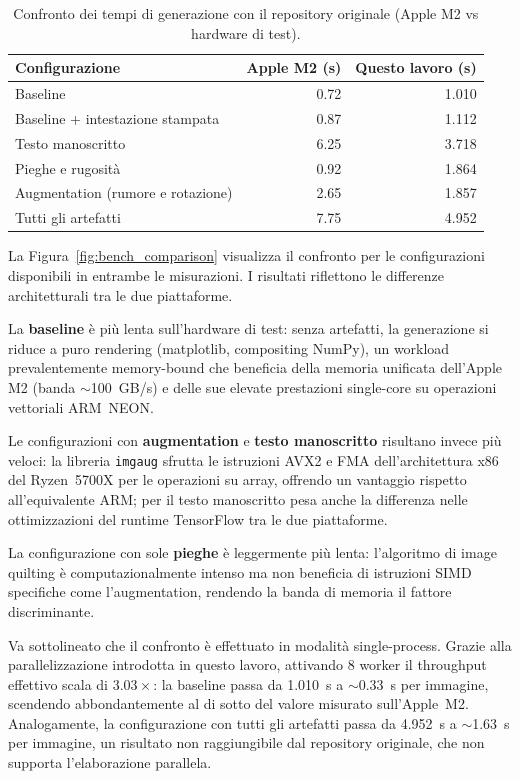 \begin{table}[H]
\centering
\caption{Confronto dei tempi di generazione con il repository originale (Apple M2 vs hardware di test).}
\label{tab:bench_original}
\begin{tabular}{lrr}
\hline
\textbf{Configurazione} & \textbf{Apple M2 (s)} & \textbf{Questo lavoro (s)} \\
\hline
Baseline                          & 0.72 & 1.010 \\
Baseline + intestazione stampata  & 0.87 & 1.112  \\
Testo manoscritto                 & 6.25 & 3.718 \\
Pieghe e rugosità                 & 0.92 & 1.864 \\
Augmentation (rumore e rotazione) & 2.65 & 1.857 \\
Tutti gli artefatti               & 7.75 & 4.952 \\
\hline
\end{tabular}
\end{table}

La Figura~\ref{fig:bench_comparison} visualizza il confronto per le configurazioni disponibili in entrambe le misurazioni. I risultati riflettono le differenze architetturali tra le due piattaforme.

La \textbf{baseline} è più lenta sull'hardware di test: senza artefatti, la generazione si riduce a puro rendering (matplotlib, compositing NumPy), un workload prevalentemente memory-bound che beneficia della memoria unificata dell'Apple M2 (banda $\sim$100~GB/s) e delle sue elevate prestazioni single-core su operazioni vettoriali ARM~NEON.

Le configurazioni con \textbf{augmentation} e \textbf{testo manoscritto} risultano invece più veloci: la libreria \texttt{imgaug} sfrutta le istruzioni AVX2 e FMA dell'architettura x86 del Ryzen~5700X per le operazioni su array, offrendo un vantaggio rispetto all'equivalente ARM; per il testo manoscritto pesa anche la differenza nelle ottimizzazioni del runtime TensorFlow tra le due piattaforme.

La configurazione con sole \textbf{pieghe} è leggermente più lenta: l'algoritmo di image quilting è computazionalmente intenso ma non beneficia di istruzioni SIMD specifiche come l'augmentation, rendendo la banda di memoria il fattore discriminante.

Va sottolineato che il confronto è effettuato in modalità single-process. Grazie alla parallelizzazione introdotta in questo lavoro, attivando 8 worker il throughput effettivo scala di $3.03\times$: la baseline passa da 1.010~s a $\sim$0.33~s per immagine, scendendo abbondantemente al di sotto del valore misurato sull'Apple~M2. Analogamente, la configurazione con tutti gli artefatti passa da 4.952~s a $\sim$1.63~s per immagine, un risultato non raggiungibile dal repository originale, che non supporta l'elaborazione parallela.

